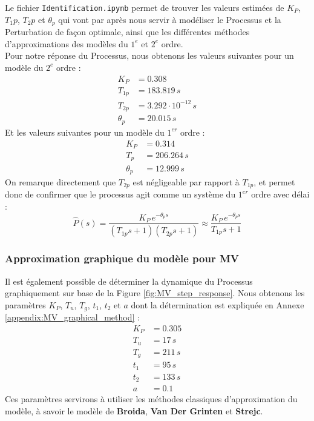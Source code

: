 Le fichier \texttt{Identification.ipynb} permet de trouver les valeurs estimées de $K_P$, $T_1p$, $T_2p$ et $\theta_p$ qui vont par après nous servir à modéliser le Processus et la Perturbation de façon optimale, ainsi que les différentes méthodes d'approximations des modèles du $1^{e}$ et $2^{e}$ ordre.\\
Pour notre réponse du Processus, nous obtenons les valeurs suivantes pour un modèle du $2^{e}$ ordre :
\begin{align*}
    K_P &= 0.308 \\
    T_{1p} &= 183.819 \,s \\
    T_{2p} &= 3.292 \cdot 10^{-12} \,s \\
    \theta_p &= 20.015 \,s
\end{align*}
Et les valeurs suivantes pour un modèle du $1^{er}$ ordre :
\begin{align*}
    K_P &= 0.314 \\
    T_{p} &= 206.264 \,s \\
    \theta_p &= 12.999 \,s
\end{align*}
On remarque directement que $T_{2p}$ est négligeable par rapport à $T_{1p}$, et permet donc de confirmer que le processus agit comme un système du $1^{er}$ ordre avec délai :
\begin{equation}
    \hat{P}(s) = \frac{K_P\,e^{-\theta_p s}}{(T_{1p}s + 1)(T_{2p}s + 1)} \approx \frac{K_P\,e^{-\theta_p s}}{T_{1p}s + 1}
\end{equation}

\subsubsection{Approximation graphique du modèle pour MV}

Il est également possible de déterminer la dynamique du Processus graphiquement sur base de la Figure \ref{fig:MV_step_response}.
Nous obtenons les paramètres $K_P$, $T_u$, $T_g$, $t_1$, $t_2$ et $a$ dont la détermination est expliquée en Annexe \ref{appendix:MV_graphical_method} :
\begin{align*}
    K_P &= 0.305 \\
    T_u &= 17 \,s \\
    T_g &= 211 \,s \\
    t_1 &= 95 \,s \\
    t_2 &= 133 \,s \\
    a &= 0.1
\end{align*}
Ces paramètres servirons à utiliser les méthodes classiques d'approximation du modèle, à savoir le modèle de \textbf{Broida}, \textbf{Van Der Grinten} et \textbf{Strejc}.

